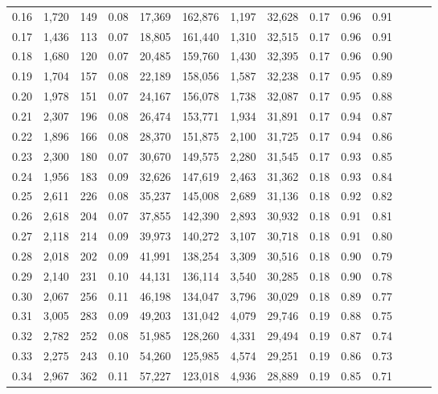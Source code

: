 \begin{tabular}{rrrrrrrrrrrrrr}
0.16 &  1,720 &  149 &  0.08 &   17,369 &  162,876 &   1,197 &  32,628 &  0.17 &  0.96 &      0.91 \\
0.17 &  1,436 &  113 &  0.07 &   18,805 &  161,440 &   1,310 &  32,515 &  0.17 &  0.96 &      0.91 \\
0.18 &  1,680 &  120 &  0.07 &   20,485 &  159,760 &   1,430 &  32,395 &  0.17 &  0.96 &      0.90 \\
0.19 &  1,704 &  157 &  0.08 &   22,189 &  158,056 &   1,587 &  32,238 &  0.17 &  0.95 &      0.89 \\
0.20 &  1,978 &  151 &  0.07 &   24,167 &  156,078 &   1,738 &  32,087 &  0.17 &  0.95 &      0.88 \\
0.21 &  2,307 &  196 &  0.08 &   26,474 &  153,771 &   1,934 &  31,891 &  0.17 &  0.94 &      0.87 \\
0.22 &  1,896 &  166 &  0.08 &   28,370 &  151,875 &   2,100 &  31,725 &  0.17 &  0.94 &      0.86 \\
0.23 &  2,300 &  180 &  0.07 &   30,670 &  149,575 &   2,280 &  31,545 &  0.17 &  0.93 &      0.85 \\
0.24 &  1,956 &  183 &  0.09 &   32,626 &  147,619 &   2,463 &  31,362 &  0.18 &  0.93 &      0.84 \\
0.25 &  2,611 &  226 &  0.08 &   35,237 &  145,008 &   2,689 &  31,136 &  0.18 &  0.92 &      0.82 \\
0.26 &  2,618 &  204 &  0.07 &   37,855 &  142,390 &   2,893 &  30,932 &  0.18 &  0.91 &      0.81 \\
0.27 &  2,118 &  214 &  0.09 &   39,973 &  140,272 &   3,107 &  30,718 &  0.18 &  0.91 &      0.80 \\
0.28 &  2,018 &  202 &  0.09 &   41,991 &  138,254 &   3,309 &  30,516 &  0.18 &  0.90 &      0.79 \\
0.29 &  2,140 &  231 &  0.10 &   44,131 &  136,114 &   3,540 &  30,285 &  0.18 &  0.90 &      0.78 \\
0.30 &  2,067 &  256 &  0.11 &   46,198 &  134,047 &   3,796 &  30,029 &  0.18 &  0.89 &      0.77 \\
0.31 &  3,005 &  283 &  0.09 &   49,203 &  131,042 &   4,079 &  29,746 &  0.19 &  0.88 &      0.75 \\
0.32 &  2,782 &  252 &  0.08 &   51,985 &  128,260 &   4,331 &  29,494 &  0.19 &  0.87 &      0.74 \\
0.33 &  2,275 &  243 &  0.10 &   54,260 &  125,985 &   4,574 &  29,251 &  0.19 &  0.86 &      0.73 \\
0.34 &  2,967 &  362 &  0.11 &   57,227 &  123,018 &   4,936 &  28,889 &  0.19 &  0.85 &      0.71 \\

\end{tabular}
